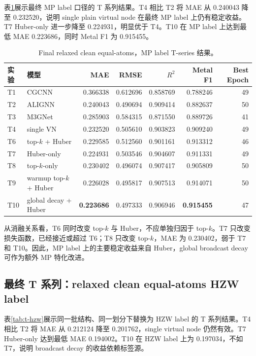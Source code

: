 \documentclass[UTF8,a4paper,11pt]{ctexart}
\newcommand{\rdsq}{R^2}
\begin{document}
表\ref{tab:t-mp}展示最终 MP label 口径的 T 系列结果。T4 相比 T2 将 MAE 从 0.240043 降至 0.232520，说明 single plain virtual node 在最终 MP label 上仍有稳定收益。T7 Huber-only 进一步降至 0.224931，明显优于 T4。T10 在 MP label 上达到最低 MAE 0.223686，同时 Metal F1 为 0.915455。

\begin{table}[htbp]
\centering
\caption{Final relaxed clean equal-atoms，MP label T-series 结果。}
\label{tab:t-mp}
\small
\begin{tabular}{l l r r r r r}
\toprule
实验 & 模型 & MAE & RMSE & $\rdsq$ & Metal F1 & Best Epoch \\
\midrule
T1 & CGCNN & 0.366338 & 0.612696 & 0.858769 & 0.788246 & 49 \\
T2 & ALIGNN & 0.240043 & 0.490694 & 0.909414 & 0.882637 & 50 \\
T3 & M3GNet & 0.285903 & 0.584315 & 0.871550 & 0.889726 & 41 \\
T4 & single VN & 0.232520 & 0.505610 & 0.903823 & 0.909240 & 49 \\
T6 & top-$k$ + Huber & 0.229585 & 0.512560 & 0.901161 & 0.913312 & 46 \\
T7 & Huber-only & 0.224931 & 0.503546 & 0.904607 & 0.911331 & 49 \\
T8 & top-$k$-only & 0.230402 & 0.496074 & 0.907417 & 0.905809 & 50 \\
T9 & warmup top-$k$ + Huber & 0.226028 & 0.495817 & 0.907513 & 0.914071 & 50 \\
T10 & global decay + Huber & \textbf{0.223686} & 0.497333 & 0.906946 & \textbf{0.915455} & 47 \\
\bottomrule
\end{tabular}
\end{table}

从消融关系看，T6 同时改变 top-$k$ 与 Huber，不应单独归因于 top-$k$。T7 只改变损失函数，已经接近或超过 T6；T8 只改变 top-$k$，MAE 为 0.230402，弱于 T7 和 T10。因此，MP label 上的主要稳定收益来自 Huber，global broadcast decay 可作为额外 MP 特化改进。

\subsection{最终 T 系列：relaxed clean equal-atoms HZW label}

表\ref{tab:t-hzw}展示同一批结构、同一划分下替换为 HZW label 的 T 系列结果。T4 相比 T2 将 MAE 从 0.212124 降至 0.201762，single virtual node 仍然有效。T7 Huber-only 达到最低 MAE 0.194002。T10 在 HZW label 上为 0.197034，不如 T7，说明 broadcast decay 的收益依赖标签源。
\end{document}
